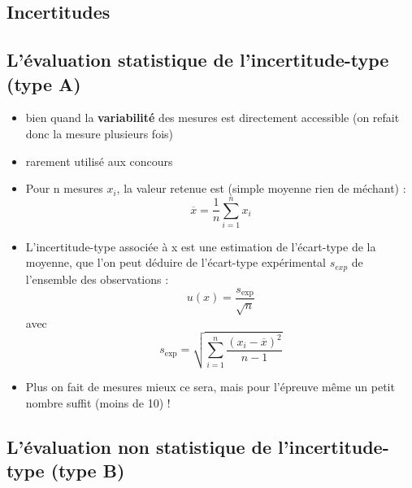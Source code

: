 \documentclass[10pt]{article}
\begin{document}
\setcounter{secnumdepth}{4}
\setcounter{tocdepth}{4}

\begin{multicols}{2}

\section{Incertitudes}

\subsection{ L’évaluation statistique de l’incertitude-type (type A)}
\begin{itemize}

    \item bien quand la \textbf{variabilité} des mesures est directement accessible (on refait donc la mesure plusieurs fois) 
    \item rarement utilisé aux concours
    \item Pour n mesures \(x_i\), la valeur retenue est (simple moyenne rien de méchant) : \[
    \overline{x} = \frac{1}{n} \sum_{i=1}^{n} x_i
    \]
    \item L’incertitude-type associée à x est une estimation de l’écart-type de la moyenne, que l’on peut déduire de l’écart-type expérimental \(s_{exp}\) de l’ensemble des observations :\[
    u(x) = \frac{s_{\text{exp}}}{\sqrt{n}}
    \]
avec \[
s_{\text{exp}} = \sqrt{\sum_{i=1}^{n} \frac{ (x_i - \overline{x})^2}{n-1}}
\]
    \item Plus on fait de mesures mieux ce sera, mais pour l'épreuve même un petit nombre suffit (moins de 10) !  
\end{itemize}


\subsection{L’évaluation non statistique de l’incertitude-type (type B)}


\end{multicols}
\end{document}
